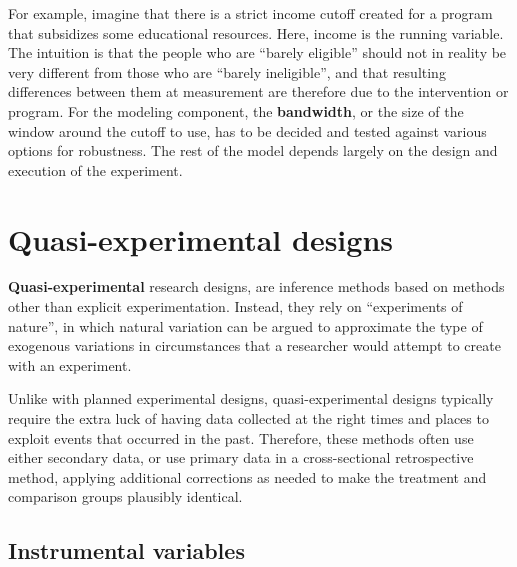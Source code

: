 For example, imagine that there is a strict income cutoff created
for a program that subsidizes some educational resources.
Here, income is the running variable.
The intuition is that the people who are ``barely eligible''
should not in reality be very different from those who are ``barely ineligible'',
and that resulting differences between them at measurement
are therefore due to the intervention or program.\cite{imbens2008regression}
For the modeling component, the \textbf{bandwidth},
or the size of the window around the cutoff to use,
has to be decided and tested against various options for robustness.
The rest of the model depends largely on the design and execution of the experiment.


\section{Quasi-experimental designs}

\textbf{Quasi-experimental} research designs,
are inference methods based on methods other than explicit experimentation.
Instead, they rely on ``experiments of nature'',
in which natural variation can be argued to approximate
the type of exogenous variations in circumstances
that a researcher would attempt to create with an experiment.\cite{dinardo2016natural}

Unlike with planned experimental designs,
quasi-experimental designs typically require the extra luck
of having data collected at the right times and places
to exploit events that occurred in the past.
Therefore, these methods often use either secondary data,
or use primary data in a cross-sectional retrospective method,
applying additional corrections as needed to make
the treatment and comparison groups plausibly identical.

\subsection{Instrumental variables}

